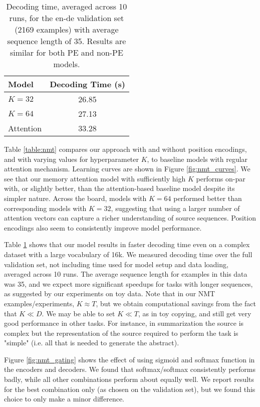 \documentclass[11pt,letterpaper]{article}
\begin{document}
\begin{table}[t]
\centering
\begin{tabular}{|l|c|}
\hline
\bf Model & \bf Decoding Time (s) \\
\hline
$K=32$ & 26.85 \\
$K=64$ & 27.13 \\
Attention & 33.28 \\
\hline
\end{tabular}
\caption{Decoding time, averaged across 10 runs, for the en-de validation set (2169 examples) with average sequence length of 35. Results are similar for both PE and non-PE models. }
\label{table:nmt_decoding_time}
\end{table}

Table \ref{table:nmt} compares our approach with and without position encodings, and with varying values for hyperparameter $K$, to baseline models with regular attention mechanism. Learning curves are shown in Figure \ref{fig:nmt_curves}. We see that our memory attention model with sufficiently high $K$ performs on-par with, or slightly better, than the attention-based baseline model despite its simpler nature. Across the board, models with $K=64$ performed better than corresponding models with $K=32$, suggesting that using a larger number of attention vectors can capture a richer understanding of source sequences. Position encodings also seem to consistently improve model performance.

Table \ref{table:nmt_decoding_time} shows that our model results in faster decoding time even on a complex dataset with a large vocabulary of 16k. We measured decoding time over the full validation set, not including time used for model setup and data loading, averaged across 10 runs. The average sequence length for examples in this data was 35, and we expect more significant speedups for tasks with longer sequences, as suggested by our experiments on toy data. Note that in our NMT examples/experiments, $K\approx T$, but we obtain computational savings from the fact that $K \ll D$. We may be able to set $K \ll T$, as in toy copying, and still get very good performance in other tasks. For instance, in summarization the source is complex but the representation of the source required to perform the task is "simple" (i.e. all that is needed to generate the abstract). 

Figure \ref{fig:nmt_gating} shows the effect of using sigmoid and softmax function in the encoders and decoders. We found that softmax/softmax consistently performs badly, while all other combinations perform about equally well. We report results for the best combination only (as chosen on the validation set), but we found this choice to only make a minor difference.
\end{document}
